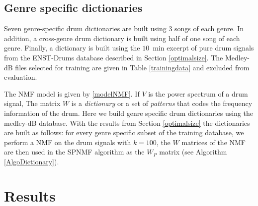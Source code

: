 \documentclass{article}
\begin{document}
\subsection{Genre specific dictionaries}\label{genrespecdict}

Seven genre-specific drum dictionaries are built using $3$ songs of each genre. In addition, a cross-genre drum dictionary is built using half of one song of each genre. Finally, a dictionary is built using the $10$~min excerpt of pure drum signals from the ENST-Drums database described in Section \ref{optimalsize}. The Medley-dB files selected for training are given in Table \ref{trainingdata} and excluded from evaluation. 

The NMF model is given by \eqref{modelNMF}. If $V$ is the power spectrum of a drum signal, The matrix $W$ is a {\em dictionary} or a set of {\em patterns} that codes the frequency information of the drum. Here we build genre specific drum dictionaries using the medley-dB database. With the results from Section \ref{optimalsize} the dictionaries are built as follows: for every genre specific subset of the training database, we perform a NMF on the drum signals with $k=100$,  the $W$ matrices of the NMF are then used in the SPNMF algorithm as the  $W_P$ matrix (see Algorithm \ref{AlgoDictionary}).

%   
%  


\section{Results}\label{sec:results}
\end{document}
